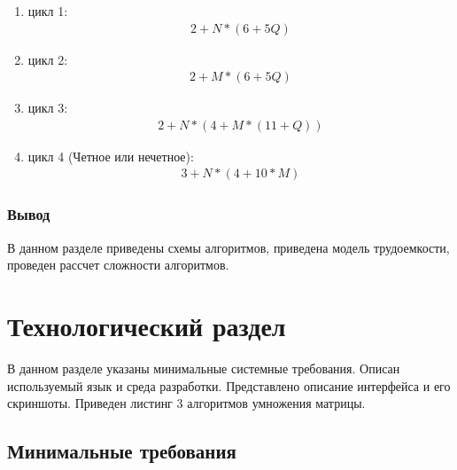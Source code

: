 \documentclass[a4paper, 14pt]{article}
\begin{document}
	\begin{enumerate}
		
		\item цикл 1: \\
		\begin{equation}\boxed{\begin{aligned}
			2 + N * (6 + 5Q)
			\end{aligned}}
		\end{equation}
		
		\item цикл 2:
		\begin{equation}\boxed{\begin{aligned}
			2 + M * (6 + 5Q)
			\end{aligned}}
		\end{equation}
		
		\item цикл 3:
		\begin{equation}\boxed{\begin{aligned}
			2 + N * ( 4 + M * (11 + Q))
			\end{aligned}}
		\end{equation}
		
		\item цикл 4 (Четное или нечетное):
		\begin{equation}\boxed{\begin{aligned}
			3 + N * (4 + 10 * M)
			\end{aligned}}
		\end{equation}
		
	\end{enumerate}
	
	\subsubsection{Вывод}
	
	В данном разделе приведены схемы алгоритмов, приведена модель трудоемкости, проведен рассчет сложности алгоритмов.
	
	
	\newpage
	\section{Технологический раздел}
	
	В данном разделе указаны минимальные системные требования. Описан используемый язык и среда разработки.
	Представлено описание интерфейса и его скриншоты. Приведен листинг 3 алгоритмов умножения матрицы.
	
	\subsection{Минимальные требования}
	
\end{document}
